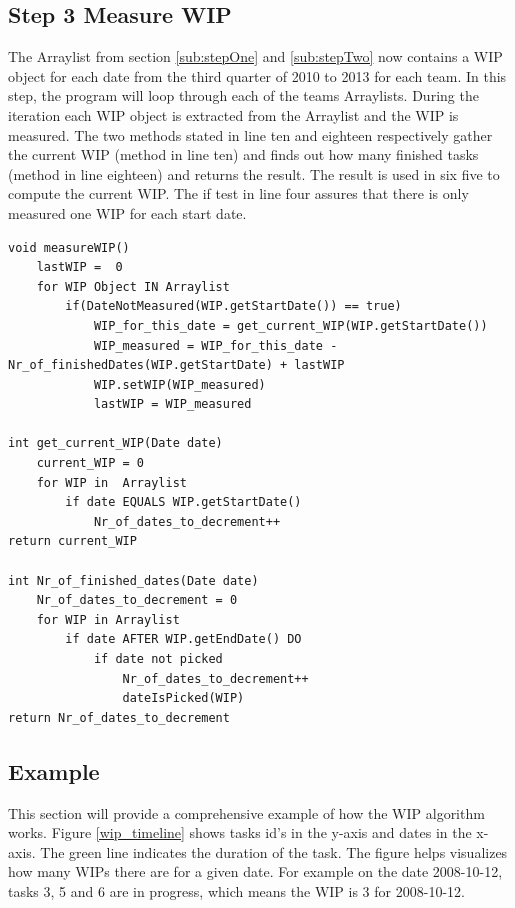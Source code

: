 \documentclass[UKenglish]{ifimaster}  %
\begin{document}
\subsection{Step 3 Measure WIP}
\vspace{-2.0em}
The Arraylist from section \ref{sub:stepOne}  and \ref{sub:stepTwo} now contains a WIP object for each date from the third quarter of 2010 to 2013 for each team. In this step, the program will loop through each of the teams Arraylists. During the iteration each WIP object is extracted from the Arraylist and the WIP is measured. The two methods stated in line ten and eighteen respectively gather the current WIP (method in line ten) and finds out how many finished tasks (method in line eighteen) and returns the result. The result is used in six five to compute the current WIP. The if test in line four assures that there is only measured one WIP for each start date.  
\begin{minipage}{\textwidth} 
\begin{lstlisting}[caption={WIP measurement},label={lst:measure}]
void measureWIP()
	lastWIP =  0
	for WIP Object IN Arraylist	
		if(DateNotMeasured(WIP.getStartDate()) == true)
			WIP_for_this_date = get_current_WIP(WIP.getStartDate())  
			WIP_measured = WIP_for_this_date - Nr_of_finishedDates(WIP.getStartDate) + lastWIP
			WIP.setWIP(WIP_measured)
			lastWIP = WIP_measured 

int get_current_WIP(Date date)
	current_WIP = 0
	for WIP in  Arraylist
		if date EQUALS WIP.getStartDate()
			Nr_of_dates_to_decrement++
return current_WIP
			 	
int Nr_of_finished_dates(Date date)
	Nr_of_dates_to_decrement = 0
	for WIP in Arraylist
		if date AFTER WIP.getEndDate() DO
			if date not picked
				Nr_of_dates_to_decrement++
				dateIsPicked(WIP)				
return Nr_of_dates_to_decrement 
 \end{lstlisting}
  \end{minipage}

\subsection{Example}
\label{sec:Example}
This section will provide a comprehensive example of how the WIP algorithm works.  
Figure \ref{wip_timeline}  shows tasks id's in the y-axis and dates in the x-axis. The green line indicates the duration of the task. The figure helps  visualizes how many WIPs there are for a given date. For example on the date 2008-10-12, tasks 3, 5 and 6 are in progress, which means the WIP is 3 for 2008-10-12.  
\end{document}
